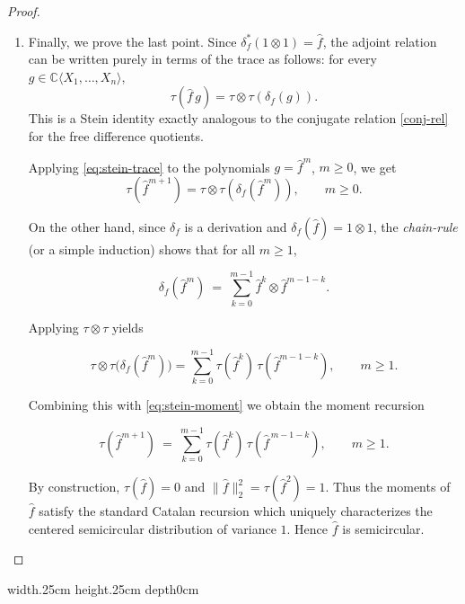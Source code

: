\documentclass[10pt,a4paper,reqno]{amsart}
\def\qed{ \hfill \vrule width.25cm height.25cm depth0cm\smallskip}
\newcommand{\A}{\mathbb{C}\langle X_1,\dots,X_n\rangle}
\begin{document}
\begin{proof}
\begin{enumerate}
  \item 
  Finally, we prove the last point. 
  \medskip
  Since $\delta_f^\ast(1\otimes 1)=\widehat{f}$, the adjoint relation
  can be written purely in terms of the trace as follows: for every $g\in\A$,
  \begin{equation}\label{eq:stein-trace}
      \tau(\widehat{f}\,g)
      = 
      \tau\otimes\tau(\delta_f(g)).
  \end{equation}
  This is a Stein identity exactly analogous to the conjugate relation 
  \eqref{conj-rel} for the free difference quotients.

  Applying \eqref{eq:stein-trace} to the polynomials $g=\widehat{f}^m$, $m\ge 0$, we get
  \begin{equation}\label{eq:stein-moment}
      \tau(\widehat{f}^{m+1})
      = 
      \tau\otimes\tau(\delta_f(\widehat{f}^m)),
      \qquad m\ge 0.
  \end{equation}

  On the other hand, since $\delta_f$ is a derivation and $\delta_f(\widehat{f})=1\otimes 1$, the \emph{chain-rule} (or a simple induction) shows that for all $m\ge 1$,
  

\[
      \delta_f(\widehat{f}^m)
      \ =\ 
      \sum_{k=0}^{m-1} \widehat{f}^k\otimes \widehat{f}^{m-1-k}.
  \]



  Applying $\tau\otimes\tau$ yields
  

\[
      \tau\otimes\tau\big(\delta_f(\widehat{f}^m)\big)
       = 
      \sum_{k=0}^{m-1} \tau(\widehat{f}^k)\,\tau(\widehat{f}^{m-1-k}),
      \qquad m\ge 1.
  \]



  Combining this with \eqref{eq:stein-moment} we obtain the moment recursion
  

\[
      \tau(\widehat{f}^{m+1})
      \ =\ 
      \sum_{k=0}^{m-1} \tau(\widehat{f}^k)\,\tau(\widehat{f}^{\,m-1-k}),
      \qquad m\ge 1.
  \]



  By construction, $\tau(\widehat{f})=0$ and $\|\widehat{f}\|_2^2=\tau(\widehat{f}^2)=1$.  
  Thus the moments of $\widehat{f}$ satisfy the standard Catalan recursion which uniquely characterizes the centered semicircular
  distribution of variance $1$. Hence $\widehat{f}$ is semicircular.

\end{enumerate}
\end{proof}
\qed
\end{document}
